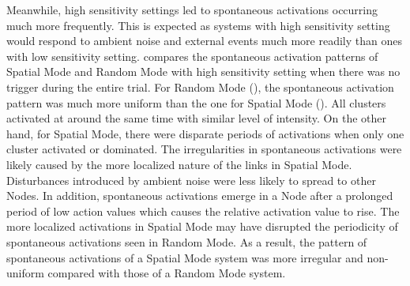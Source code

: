 Meanwhile, high sensitivity settings led to spontaneous activations occurring much more frequently. This is expected as systems with high sensitivity setting would respond to ambient noise and external events much more readily than ones with low sensitivity setting.  compares the spontaneous activation patterns of Spatial Mode and Random Mode with high sensitivity setting when there was no trigger during the entire trial. For Random Mode (), the spontaneous activation pattern was much more uniform than the one for Spatial Mode (). All clusters activated at around the same time with similar level of intensity. On the other hand, for Spatial Mode, there were disparate periods of activations when only one cluster activated or dominated. The irregularities in spontaneous activations were likely caused by the more localized nature of the links in Spatial Mode. Disturbances introduced by ambient noise were less likely to spread to other Nodes. In addition, spontaneous activations emerge in a Node after a prolonged period of low action values which causes the relative activation value to rise. The more localized activations in Spatial Mode may have disrupted the periodicity of spontaneous activations seen in Random Mode. As a result, the pattern of spontaneous activations of a Spatial Mode system was more irregular and non-uniform compared with those of a Random Mode system.


